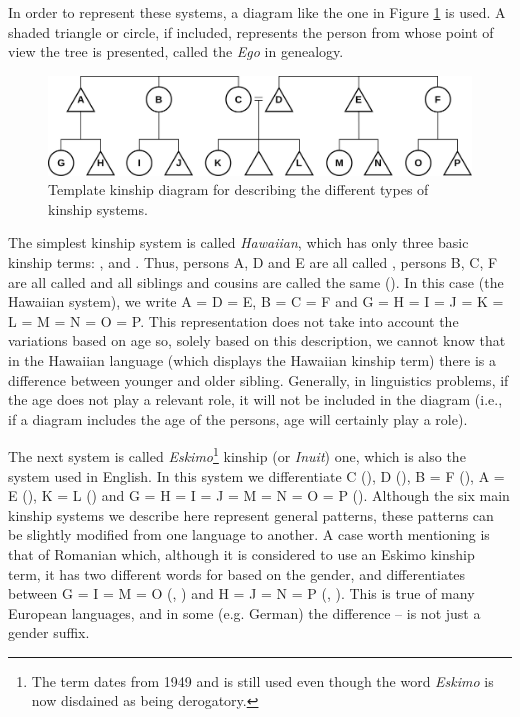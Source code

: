 \begin{refsection}
In order to represent these systems, a diagram like the one in Figure \ref{fig:template-kinship} is used. A shaded triangle or circle, if included, represents the person from whose point of view the tree is presented, called the \textit{Ego} in genealogy.

\begin{figure}[h]
  \includegraphics[width = \linewidth]{figures/kinship_template.pdf}
  \caption{Template kinship diagram for describing the different types of kinship systems.}
  \label{fig:template-kinship}
\end{figure}

The simplest kinship system is called \emph{Hawaiian}, which has only three basic kinship terms: ,  and . Thus, persons A, D and E are all called , persons B, C, F are all called  and all siblings and cousins are called the same (). In this case (the Hawaiian system), we write A = D = E, B = C = F and G = H = I = J = K = L = M = N = O = P. This representation does not take into account the variations based on age so, solely based on this description, we cannot know that in the Hawaiian language (which displays the Hawaiian kinship term) there is a difference between younger and older sibling. Generally, in linguistics problems, if the age does not play a relevant role, it will not be included in the diagram (i.e., if a diagram includes the age of the persons, age will certainly play a role).

The next system is called \emph{Eskimo}\footnote{The term dates from 1949 and is still used even though the word \textit{Eskimo} is now disdained as being derogatory.} kinship (or \emph{Inuit}) one, which is also the system used in English. In this system we differentiate C (), D (), B = F (), A = E (), K = L () and G = H = I = J = M = N = O = P (). Although the six main kinship systems we describe here represent general patterns, these patterns can be slightly modified from one language to another. A case worth mentioning is that of Romanian which, although it is considered to use an Eskimo kinship term, it has two different words for  based on the gender, and differentiates between G = I = M = O (, ) and H = J = N = P (, ). This is true of many European languages, and in some (e.g. German) the difference -- is not just a gender suffix. 


\end{refsection}
